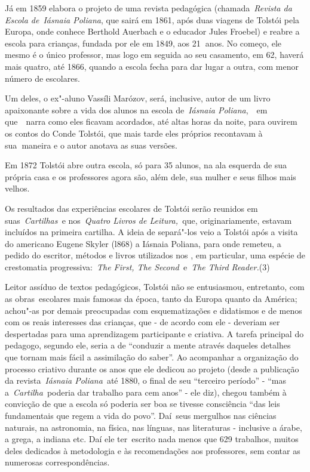 Já em 1859 elabora o projeto de uma revista pedagógica
(chamada~\emph{Revista da Escola de}~\emph{Iásnaia Poliana}, que sairá
em 1861, após duas viagens de Tolstói pela Europa, onde conhece Berthold
Auerbach e o educador Jules Froebel) e reabre a escola para crianças,
fundada por ele em 1849, aos 21\textbf{~}anos. No começo, ele mesmo é o
único professor, mas logo em seguida ao seu casamento, em 62, haverá
mais quatro, até 1866, quando a escola fecha para dar lugar a outra, com
menor número de escolares.

Um deles, o ex"-aluno Vassíli Marózov, será, inclusive, autor de um livro
apaixonante sobre a vida dos alunos na escola de~\emph{Iásnaia
Poliana},~~em que~~narra como eles ficavam acordados, até altas horas da
noite, para ouvirem os contos do Conde Tolstói, que mais tarde eles
próprios recontavam à sua\textbf{~}maneira e o autor anotava as suas
versões.

Em 1872 Tolstói abre outra escola, só para 35 alunos, na ala esquerda de
sua própria casa e os professores agora são, além dele, sua mulher e
seus filhos mais velhos.

Os resultados das experiências escolares de Tolstói serão reunidos em
suas~\emph{Cartilhas~}e nos~\emph{Quatro Livros de Leitura,~}que,
originariamente, estavam incluídos na primeira cartilha. A ideia de
separá"-los veio a Tolstói após a visita do americano Eugene Skyler
(l868) a Iásnaia Poliana, para onde remeteu, a pedido do escritor,
métodos e livros utilizados nos , em particular, uma espécie de
crestomatia progressiva:~\emph{The First, The Second~}e~\emph{The Third
Reader.}(3)

Leitor assíduo de textos pedagógicos, Tolstói não se entusiasmou,
entretanto, com as obras~escolares mais famosas da época, tanto da
Europa quanto da América; achou"-as por demais preocupadas com
esquematizações e didatismos e de menos com os reais interesses das
crianças, que - de acordo com ele - deveriam ser despertadas para uma
aprendizagem participante e criativa. A tarefa principal do pedagogo,
segundo ele, seria a de ``conduzir a mente através daqueles detalhes que
tornam mais fácil a assimilação do saber''. Ao acompanhar a organização
do processo criativo durante os anos que ele dedicou ao projeto (desde a
publicação da revista~\emph{Iásnaia Poliana}~até 1880, o final de seu
``terceiro período'' - ``mas a~\emph{Cartilha}~poderia dar trabalho para
cem anos'' - ele diz), chegou também à convicção de que a escola só
poderia ser boa se tivesse consciência ``das leis fundamentais que regem
a vida do povo''. Daí~seus mergulhos nas ciências naturais, na
astronomia, na física, nas línguas, nas literaturas - inclusive a árabe,
a grega, a indiana etc. Daí ele ter~escrito nada menos que 629
trabalhos, muitos deles dedicados à metodologia e às recomendações aos
professores, sem contar as numerosas correspondências.~~

